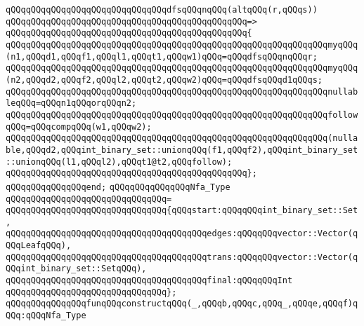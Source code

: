 \newline
\verb|qQQqqQQqqQQqqQQqqQQqqQQqqQQqqQQqdfsqQQqnqQQq(altqQQq(r,qQQqs))|\newline
\verb|qQQqqQQqqQQqqQQqqQQqqQQqqQQqqQQqqQQqqQQqqQQqqQQq=>|\newline
\verb|qQQqqQQqqQQqqQQqqQQqqQQqqQQqqQQqqQQqqQQqqQQqqQQq{|\newline
\verb|qQQqqQQqqQQqqQQqqQQqqQQqqQQqqQQqqQQqqQQqqQQqqQQqqQQqqQQqqQQqqQQqmyqQQq(n1,qQQqd1,qQQqf1,qQQql1,qQQqt1,qQQqw1)qQQq=qQQqdfsqQQqnqQQqr;|\newline
\verb|qQQqqQQqqQQqqQQqqQQqqQQqqQQqqQQqqQQqqQQqqQQqqQQqqQQqqQQqqQQqqQQqmyqQQq(n2,qQQqd2,qQQqf2,qQQql2,qQQqt2,qQQqw2)qQQq=qQQqdfsqQQqd1qQQqs;|\newline
\newline
\verb|qQQqqQQqqQQqqQQqqQQqqQQqqQQqqQQqqQQqqQQqqQQqqQQqqQQqqQQqqQQqqQQqnullableqQQq=qQQqn1qQQqorqQQqn2;|\newline
\verb|qQQqqQQqqQQqqQQqqQQqqQQqqQQqqQQqqQQqqQQqqQQqqQQqqQQqqQQqqQQqqQQqfollowqQQq=qQQqcompqQQq(w1,qQQqw2);|\newline
\newline
\verb|qQQqqQQqqQQqqQQqqQQqqQQqqQQqqQQqqQQqqQQqqQQqqQQqqQQqqQQqqQQqqQQq(nullable,qQQqd2,qQQqint_binary_set::unionqQQq(f1,qQQqf2),qQQqint_binary_set::unionqQQq(l1,qQQql2),qQQqt1@t2,qQQqfollow);|\newline
\verb|qQQqqQQqqQQqqQQqqQQqqQQqqQQqqQQqqQQqqQQqqQQqqQQq};|\newline
\verb|qQQqqQQqqQQqqQQqend;|\newline
\newline
\verb|qQQqqQQqqQQqqQQqNfa_Type|\newline
\verb|qQQqqQQqqQQqqQQqqQQqqQQqqQQqqQQq=|\newline
\verb|qQQqqQQqqQQqqQQqqQQqqQQqqQQqqQQq{qQQqstart:qQQqqQQqint_binary_set::Set,|\newline
\verb|qQQqqQQqqQQqqQQqqQQqqQQqqQQqqQQqqQQqqQQqedges:qQQqqQQqvector::Vector(qQQqLeafqQQq),|\newline
\verb|qQQqqQQqqQQqqQQqqQQqqQQqqQQqqQQqqQQqqQQqtrans:qQQqqQQqvector::Vector(qQQqint_binary_set::SetqQQq),|\newline
\verb|qQQqqQQqqQQqqQQqqQQqqQQqqQQqqQQqqQQqqQQqfinal:qQQqqQQqInt|\newline
\verb|qQQqqQQqqQQqqQQqqQQqqQQqqQQqqQQq};|\newline
\newline
\verb|qQQqqQQqqQQqqQQqfunqQQqconstructqQQq(_,qQQqb,qQQqc,qQQq_,qQQqe,qQQqf)qQQq:qQQqNfa_Type|\newline
